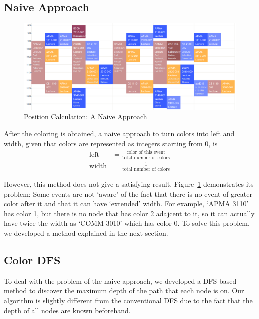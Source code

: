 \documentclass[12pt]{article}
\begin{document}
\subsection{Naive Approach}
\begin{figure}[H]
    \centering
    \includegraphics[width=\columnwidth]{pos-calc-exp1.png}
    \caption{Position Calculation: A Naive Approach}
    \label{fig:pos-naive}
\end{figure}
After the coloring is obtained, a naive approach to turn colors into left and width, given that colors are represented as integers starting from 0, is
\begin{align*}
    \text{left} &= \frac{\text{color of this event}}{\text{total number of colors}} \\
    \text{width} &= \frac{1}{\text{total number of colors}}
\end{align*}

However, this method does not give a satisfying result. Figure~\ref{fig:pos-naive} demonstrates its problem: Some events are not `aware' of the fact that there is no event of greater color after it and that it can have `extended' width. For example, `APMA 3110' has color 1, but there is no node that has color 2 adajcent to it, so it can actually have twice the width as `COMM 3010' which has color 0. To solve this problem, we developed a method explained in the next section. 

\subsection{Color DFS}
To deal with the problem of the naive approach, we developed a DFS-based method to discover the maximum depth of the path that each node is on. Our algorithm is slightly different from the conventional DFS due to the fact that the depth of all nodes are known beforehand. 
\end{document}
